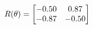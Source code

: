 \documentclass[preview]{standalone}
\begin{document}
\begin{align*}
\special{dvisvgm:raw <g id='unique000'>}R(\theta) = \begin{bmatrix}-0.50 & 0.87\\-0.87 & -0.50\end{bmatrix}\special{dvisvgm:raw </g>}
\end{align*}
\end{document}
